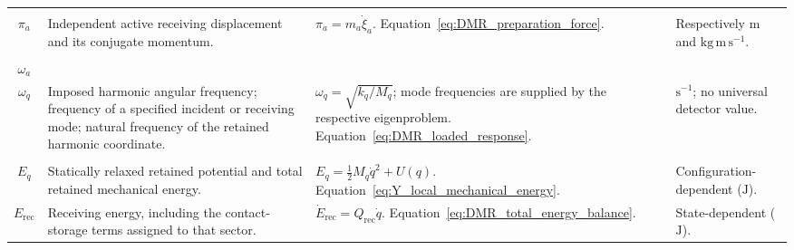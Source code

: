 \begin{longtable}{@{} c p{5.5cm} p{4cm} p{3.5cm} @{}}
\begin{tabular}[c]{@{}c@{}}$\xi_a$ \\ $\pi_a$\end{tabular} & {\raggedright Independent active receiving displacement and its conjugate momentum.\par} & {\raggedright $\pi_a=m_a\dot\xi_a$. \newline Equation~\eqref{eq:DMR_preparation_force}.\par} & {\raggedright Respectively $\mathrm m$ and $\mathrm{kg\,m\,s^{-1}}$.\par} \\

\begin{tabular}[c]{@{}c@{}}$\omega$ \\ $\omega_a$ \\ $\omega_q$\end{tabular} & {\raggedright Imposed harmonic angular frequency; frequency of a specified incident or receiving mode; natural frequency of the retained harmonic coordinate.\par} & {\raggedright $\omega_q=\sqrt{k_q/M_q}$; mode frequencies are supplied by the respective eigenproblem. \newline Equation~\eqref{eq:DMR_loaded_response}.\par} & {\raggedright $\mathrm{s^{-1}}$; no universal detector value.\par} \\

\begin{tabular}[c]{@{}c@{}}$U(q)$ \\ $E_q$\end{tabular} & {\raggedright Statically relaxed retained potential and total retained mechanical energy.\par} & {\raggedright $E_q=\tfrac12M_q\dot q^2+U(q)$. \newline Equation~\eqref{eq:Y_local_mechanical_energy}.\par} & {\raggedright Configuration-dependent ($\mathrm J$).\par} \\

$E_{\mathrm{rec}}$ & {\raggedright Receiving energy, including the contact-storage terms assigned to that sector.\par} & {\raggedright $\dot E_{\mathrm{rec}}=Q_{\mathrm{rec}}\dot q$. \newline Equation~\eqref{eq:DMR_total_energy_balance}.\par} & {\raggedright State-dependent ($\mathrm J$).\par} \\


\end{longtable}
